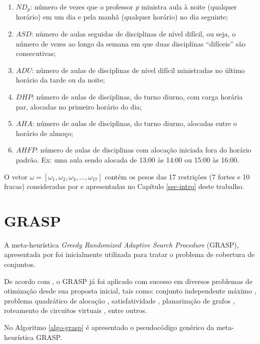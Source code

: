 \begin{enumerate}[leftmargin=1.5\parindent]
	\item \(ND_p\): número de vezes que o professor \textit{p} ministra aula à noite (qualquer horário) em um dia e pela manhã (qualquer horário) no dia seguinte;
	\item \(ASD\): número de aulas seguidas de disciplinas de nível difícil, ou seja, o número de vezes ao longo da semana em que duas disciplinas “difíceis” são consecutivas;
	\item \(ADU\): número de aulas de disciplinas de nível difícil ministradas no último horário da tarde ou da noite;
	\item \(DHP\): número de aulas de disciplinas, do turno diurno, com carga horária par, alocadas no primeiro horário do dia;
	\item \(AHA\): número de aulas de disciplinas, do turno diurno, alocadas entre o horário de almoço;
	\item \(AHFP\): número de aulas de disciplinas com alocação iniciada fora do horário padrão. Ex: uma aula sendo alocada de 13:00 às 14:00 ou 15:00 às 16:00.
\end{enumerate}

O vetor \(\omega = [\omega_1, \omega_2, \omega_3, ..., \omega_{17}]\) contém os pesos das 17 restrições (7 fortes e 10 fracas) consideradas por  e apresentadas no Capítulo \ref{sec-intro} deste trabalho.

\section{GRASP}
\label{sec-met-grasp}

A meta-heurística \textit{Greedy Randomized Adaptive Search Procedure} (GRASP), apresentada por  foi inicialmente utilizada para tratar o problema de cobertura de conjuntos.

De acordo com , o GRASP já foi aplicado com sucesso em diversos problemas de otimização desde sua proposta inicial, tais como: conjunto independente máximo \cite{feo1994greedy}, problema quadrático de alocação \cite{li1994greedy}, satisfatividade \cite{resende1996grasp}, planarização de grafos \cite{resende1997grasp}, roteamento de circuitos virtuais \cite{resende2003grasp}, entre outros.

No Algoritmo \ref{algo-grasp} é apresentado o pseudocódigo genérico da meta-heurística GRASP.


